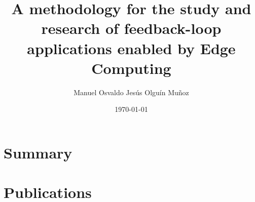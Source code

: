 \documentclass[electronic,oldfontcommands]{kthesis}
\begin{document}
\title{A methodology for the study and research of feedback-loop applications enabled by Edge Computing}
\subtitle{{}}
\author{Manuel {Osvaldo Jesús} {Olguín Muñoz}}
\date{\today}
\address{%
	KTH Royal Institute of Technology\\%
	School of Electrical Engineering and Computer Science\\%
	Division of Information Science and Engineering\\%
	SE-10044 Stockholm\\%
	Sweden%
}

\maketitle

\frontmatter %




\printglossary%


\mainmatter %

\tableofcontents*{}

\part{Summary}\label{part:summary}







\renewcommand\chaptername{\newchaptername}
\renewcommand*{\thechapter}{\Alph{chapter}}
\part{Publications}\label{part:publications}







\end{document}
